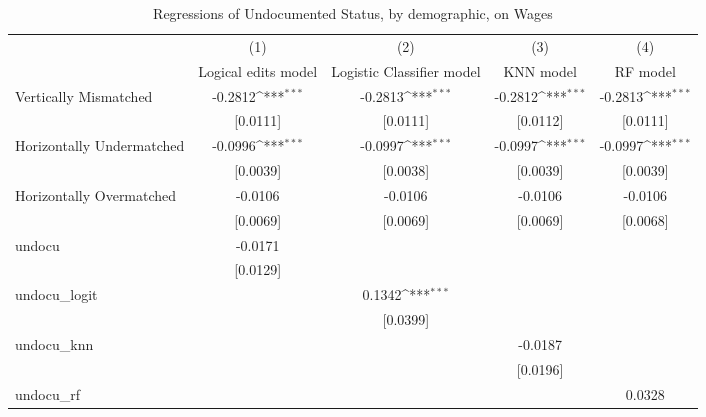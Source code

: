 \begin{table}[htbp]\centering
\def\sym#1{\ifmmode^{#1}\else\(^{#1}\)\fi}
\caption{Regressions of Undocumented Status, by demographic, on Wages}
\begin{tabular}{l*{4}{c}}
\toprule
                    &\multicolumn{1}{c}{(1)}         &\multicolumn{1}{c}{(2)}         &\multicolumn{1}{c}{(3)}         &\multicolumn{1}{c}{(4)}         \\
                    &Logical edits model         &Logistic Classifier model         &   KNN model         &    RF model         \\
\midrule
Vertically Mismatched&     -0.2812\sym{***}&     -0.2813\sym{***}&     -0.2812\sym{***}&     -0.2813\sym{***}\\
                    &    [0.0111]         &    [0.0111]         &    [0.0112]         &    [0.0111]         \\
\addlinespace
Horizontally Undermatched&     -0.0996\sym{***}&     -0.0997\sym{***}&     -0.0997\sym{***}&     -0.0997\sym{***}\\
                    &    [0.0039]         &    [0.0038]         &    [0.0039]         &    [0.0039]         \\
\addlinespace
Horizontally Overmatched&     -0.0106         &     -0.0106         &     -0.0106         &     -0.0106         \\
                    &    [0.0069]         &    [0.0069]         &    [0.0069]         &    [0.0068]         \\
\addlinespace
undocu              &     -0.0171         &                     &                     &                     \\
                    &    [0.0129]         &                     &                     &                     \\
\addlinespace
undocu\_logit        &                     &      0.1342\sym{***}&                     &                     \\
                    &                     &    [0.0399]         &                     &                     \\
\addlinespace
undocu\_knn          &                     &                     &     -0.0187         &                     \\
                    &                     &                     &    [0.0196]         &                     \\
\addlinespace
undocu\_rf           &                     &                     &                     &      0.0328         \\

\end{tabular}
\end{table}
